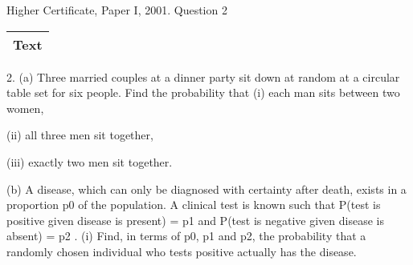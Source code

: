 \documentclass[a4paper,12pt]{article}
\begin{document}
Higher Certificate, Paper I, 2001. Question 2
\begin{table}[ht!]
 \centering
 \begin{tabular}{|p{15cm}|}
 \hline
\noindent Text
\\ \hline
  \end{tabular}
\end{table}



2. (a) Three married couples at a dinner party sit down at random at a circular
table set for six people. Find the probability that
(i) each man sits between two women,

(ii) all three men sit together,

(iii) exactly two men sit together.

(b) A disease, which can only be diagnosed with certainty after death, exists in
a proportion p0 of the population. A clinical test is known such that
P(test is positive given disease is present) = p1
and
P(test is negative given disease is absent) = p2 .
(i) Find, in terms of p0, p1 and p2, the probability that a randomly
chosen individual who tests positive actually has the disease.
\end{document}
